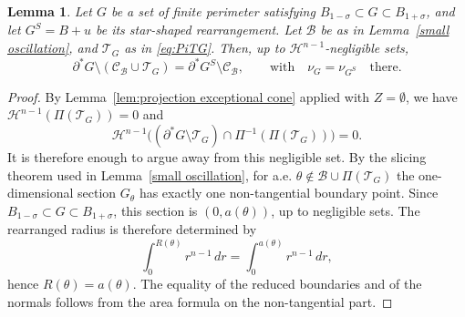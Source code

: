 \documentclass[reqno,11pt]{amsart}
\makeatletter
\newcommand{\HH}{\mathscr H}
\newtheorem{lem}[thm]{Lemma}%
\numberwithin{equation}{section}
\theoremstyle{remark}
\makeatother
\begin{document}
\begin{lem}\label{lem:star trace outside bad}
Let $G$ be a set of finite perimeter satisfying
$B_{1-\sigma}\subset G\subset B_{1+\sigma}$, and let
$G^S=B+u$ be its star-shaped rearrangement. Let $\mathcal B$ be as in
Lemma~\ref{small oscillation}, and $\mathcal T_G$ as in \eqref{eq:PiTG}.
Then, up to
$\HH^{n-1}$-negligible sets,
$$
\partial^*G\setminus(\mathcal C_{\mathcal B}\cup\mathcal T_G)
=\partial^*G^S\setminus\mathcal C_{\mathcal B},
\qquad \text{with}\quad
\nu_G=\nu_{G^S}\quad\text{there.}
$$
\end{lem}

\begin{proof}
By Lemma~\ref{lem:projection exceptional cone} applied with $Z=\emptyset$, we have
$\HH^{n-1}(\Pi(\mathcal T_G))=0$ and
\[
\HH^{n-1}\big((\partial^*G\setminus\mathcal T_G)\cap
\Pi^{-1}(\Pi(\mathcal T_G))\big)=0.
\]
It is therefore enough to argue away from this negligible set.
By the slicing theorem used in Lemma~\ref{small oscillation}, for a.e.
$\theta\notin\mathcal B \cup \Pi(\mathcal T_G)$ the one-dimensional section $G_\theta$ has exactly one
non-tangential boundary point. Since $B_{1-\sigma}\subset G\subset B_{1+\sigma}$,
this section is $(0,a(\theta))$, up to negligible sets. The rearranged radius is
therefore determined by
$$
\int_0^{R(\theta)}r^{n-1}\,dr=\int_0^{a(\theta)}r^{n-1}\,dr,
$$
hence $R(\theta)=a(\theta)$. The equality of the reduced boundaries and of the
normals follows from the area formula on the non-tangential part. 
\end{proof}
\end{document}
